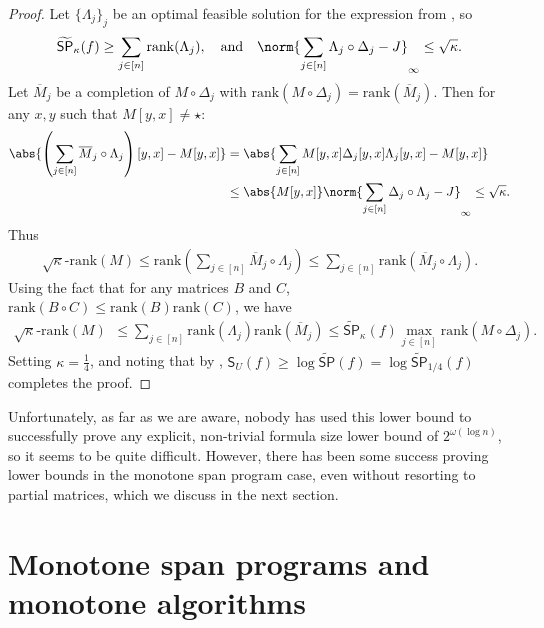 \documentclass[11pt]{article}
\numberwithin{equation}{section}
\theoremstyle{definition}
\theoremstyle{plain}
\begin{document}
\begin{proof}
Let $\{\Lambda_j\}_j$ be an optimal feasible solution for the expression from , so 
$$\widetilde{\mathsf{SP}}_{\kappa}(f)\geq \sum_{j\in [n]}\mathrm{rank}(\Lambda_j),\quad\mbox{and}\quad 
\norm{\sum_{j\in[n]}\Lambda_j\circ\Delta_j - J}_\infty\leq \sqrt\kappa.$$
Let $\overline{M}_j$ be a completion of $M\circ\Delta_j$ with $\mbox{rank}(M\circ\Delta_j)=\mbox{rank}(\overline{M}_j)$. Then for any $x,y$ such that $M[y,x]\neq \star$:
\begin{align*}
\abs{\left(\sum_{j\in [n]}\overline{M}_j\circ\Lambda_j\right)[y,x]-M[y,x]} &= \abs{\sum_{j\in[n]}M[y,x]\Delta_j[y,x]\Lambda_j[y,x]-M[y,x]}\\
&\leq \abs{M[y,x]}\norm{\sum_{j\in [n]}\Delta_j\circ\Lambda_j-J}_\infty\leq \sqrt{\kappa}.
\end{align*}
Thus
\begin{align*}
\sqrt{\kappa}\mbox{-rank}(M) \leq \mbox{rank}\left(\sum_{j\in [n]}\overline{M}_j\circ\Lambda_j\right)\leq \sum_{j\in [n]}\mathrm{rank}(\overline{M}_j\circ\Lambda_j).
\end{align*}
Using the fact that for any matrices $B$ and $C$, $\mathrm{rank}(B\circ C)\leq \mathrm{rank}(B)\mathrm{rank}(C)$, we have 
\begin{align*}
\sqrt{\kappa}\mbox{-rank}(M)&\leq \sum_{j\in[n]}\mathrm{rank}(\Lambda_j)\mathrm{rank}(\overline{M}_j)
\leq  \widetilde{\mathsf{SP}}_\kappa(f)\max_{j\in [n]}\mathrm{rank}(M\circ\Delta_j).
\end{align*}
Setting $\kappa=\frac{1}{4}$, and noting that by , $\mathsf{S}_U(f)\geq \log\widetilde{\mathsf{SP}}(f)=\log\widetilde{\mathsf{SP}}_{1/4}(f)$ completes the proof.
\end{proof}



Unfortunately, as far as we are aware, nobody has used this lower bound to successfully prove any explicit, non-trivial formula size lower bound of $2^{\omega(\log n)}$, so it seems to be quite difficult. However, there has been some success proving lower bounds in the monotone span program case, even without resorting to partial matrices, which we discuss in the next section. 

\section{Monotone span programs and monotone algorithms}\label{sec:monotone}
\end{document}
